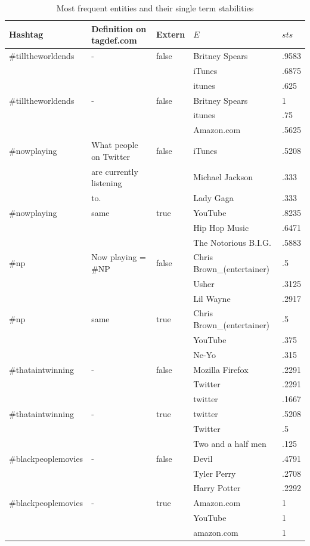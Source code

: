 \documentclass{llncs}
\begin{document}
\begin{table}[ht]
\centering
\small
\begin{tabular}{l|l|l|l|l}
Hashtag & Definition on tagdef.com & Extern & $E$ & $sts$ \\%
\hline
\#tilltheworldends & - & false & Britney Spears & .9583 \\
& & &  iTunes & .6875 \\
& & &  itunes & .625 \\ 
\hline
\#tilltheworldends & - & false & Britney Spears & 1 \\
& & &  itunes & .75 \\
& & &  Amazon.com & .5625 \\ 
\hline
\#nowplaying & What people on Twitter & false & iTunes & .5208 \\
             & are currently listening & & Michael Jackson & .333 \\
             & to. & & Lady Gaga & .333 \\
\hline
\#nowplaying & same & true & YouTube & .8235 \\
             &  &  & Hip Hop Music & .6471 \\
             &  &  & The Notorious B.I.G. & .5883 \\
\hline
\#np         & Now playing = \#NP & false & Chris Brown\_(entertainer) & .5 \\
& & & Usher & .3125 \\
& & & Lil Wayne & .2917 \\
\hline
\#np & same & true & Chris Brown\_(entertainer) & .5 \\
& & & YouTube & .375 \\
& & & Ne-Yo & .315 \\
\hline
\#thataintwinning & -& false & Mozilla Firefox & .2291 \\
& & & Twitter & .2291 \\
& & & twitter & .1667 \\
\hline
\#thataintwinning & - & true & twitter & .5208 \\
& & & Twitter & .5 \\
& & & Two and a half men & .125 \\
\hline
\#blackpeoplemovies & - & false & Devil & .4791 \\
& & & Tyler Perry & .2708 \\
& & & Harry Potter & .2292 \\
\hline
\#blackpeoplemovies & - & true & Amazon.com & 1 \\
& & & YouTube & 1 \\
& & & amazon.com & 1
\end{tabular}
\label{tbl:entities}
\caption{Most frequent entities and their single term stabilities}
\end{table}
\end{document}
